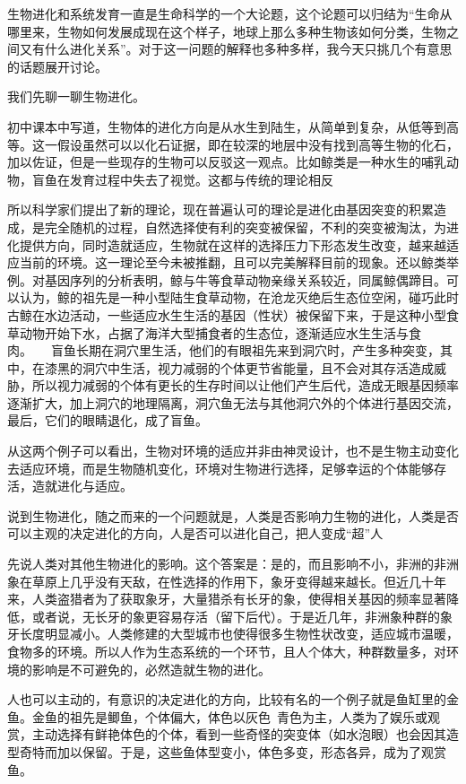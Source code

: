 \documentclass[UTF8]{ctexart}
\begin{document}
\newpage
生物进化和系统发育一直是生命科学的一个大论题，这个论题可以归结为“生命从哪里来，生物如何发展成现在这个样子，地球上那么多种生物该如何分类，生物之间又有什么进化关系”。对于这一问题的解释也多种多样，我今天只挑几个有意思的话题展开讨论。\par
我们先聊一聊生物进化。\par 初中课本中写道，生物体的进化方向是从水生到陆生，从简单到复杂，从低等到高等。这一假设虽然可以以化石证据，即在较深的地层中没有找到高等生物的化石，加以佐证，但是一些现存的生物可以反驳这一观点。比如鲸类是一种水生的哺乳动物，盲鱼在发育过程中失去了视觉。这都与传统的理论相反\par 所以科学家们提出了新的理论，现在普遍认可的理论是进化由基因突变的积累造成，是完全随机的过程，自然选择使有利的突变被保留，不利的突变被淘汰，为进化提供方向，同时造就适应，生物就在这样的选择压力下形态发生改变，越来越适应当前的环境。这一理论至今未被推翻，且可以完美解释目前的现象。还以鲸类举例。对基因序列的分析表明，鲸与牛等食草动物亲缘关系较近，同属鲸偶蹄目。可以认为，鲸的祖先是一种小型陆生食草动物，在沧龙灭绝后生态位空闲，碰巧此时古鲸在水边活动，一些适应水生生活的基因（性状）被保留下来，于是这种小型食草动物开始下水，占据了海洋大型捕食者的生态位，逐渐适应水生生活与食肉。\ \ \ 盲鱼长期在洞穴里生活，他们的有眼祖先来到洞穴时，产生多种突变，其中，在漆黑的洞穴中生活，视力减弱的个体更节省能量，且不会对其存活造成威胁，所以视力减弱的个体有更长的生存时间以让他们产生后代，造成无眼基因频率逐渐扩大，加上洞穴的地理隔离，洞穴鱼无法与其他洞穴外的个体进行基因交流，最后，它们的眼睛退化，成了盲鱼。\par
从这两个例子可以看出，生物对环境的适应并非由神灵设计，也不是生物主动变化去适应环境，而是生物随机变化，环境对生物进行选择，足够幸运的个体能够存活，造就进化与适应。\par
说到生物进化，随之而来的一个问题就是，人类是否影响力生物的进化，人类是否可以主观的决定进化的方向，人是否可以进化自己，把人变成“超”人\par
先说人类对其他生物进化的影响。这个答案是：是的，而且影响不小，非洲的非洲象在草原上几乎没有天敌，在性选择的作用下，象牙变得越来越长。但近几十年来，人类盗猎者为了获取象牙，大量猎杀有长牙的象，使得相关基因的频率显著降低，或者说，无长牙的象更容易存活（留下后代）。于是近几年，非洲象种群的象牙长度明显减小。人类修建的大型城市也使得很多生物性状改变，适应城市温暖，食物多的环境。所以人作为生态系统的一个环节，且人个体大，种群数量多，对环境的影响是不可避免的，必然造就生物的进化。\par
人也可以主动的，有意识的决定进化的方向，比较有名的一个例子就是鱼缸里的金鱼。金鱼的祖先是鲫鱼，个体偏大，体色以灰色\ 青色为主，人类为了娱乐或观赏，主动选择有鲜艳体色的个体，看到一些奇怪的突变体（如水泡眼）也会因其造型奇特而加以保留。于是，这些鱼体型变小，体色多变，形态各异，成为了观赏鱼。
\end{document}
